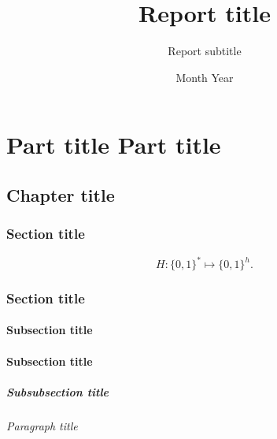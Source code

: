 \documentclass{enisareport}
\title{ Report title }
\subtitle{ Report subtitle }
\date{Month Year}
\theoremstyle{plain}
\theoremstyle{definition}
\begin{document}
\maketitle

\tableofcontents

\part{Part title Part title}\label{p1}
\chapter{Chapter title}\label{chap1}

\lipsum[1]


\marginnote{%
  \lipsum[1][2]
} 

\section{Section title}\label{sec1.1}

\lipsum[1][4]
%
\begin{equation*}
  H : \{0,1\}^{*} \mapsto \{0,1\}^{h}.
  \end{equation*}
%
\lipsum[2][4]

\section{Section title}

\lipsum[3][1-6]

\subsection{Subsection title}

\lipsum[3][2-9]

\subsection{Subsection title}

\lipsum[3][2-9]

\subsubsection{Subsubsection title}

\lipsum[3][3-6]

\paragraph{Paragraph title}
\end{document}
